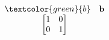 \documentclass[preview]{standalone}
\begin{document}
\begin{align*}
\begin{array}{c}\begin{matrix}\textcolor{green}{b} & \mathbf{b} \end{matrix} \\\begin{bmatrix} 1 & 0 \\0 & 1 \end{bmatrix} \end{array}
\end{align*}
\end{document}
